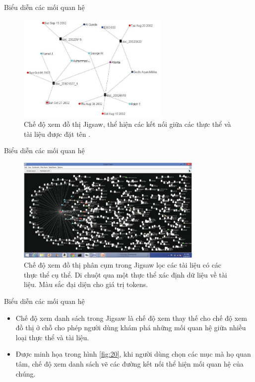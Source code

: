 \documentclass[10pt]{beamer}
\theoremstyle{remark}
\theoremstyle{definition}
\begin{document}
\begin{frame}{Biểu diễn các mối quan hệ}
	\begin{figure}[h!]
        \centering
        \includegraphics[width=0.65\textwidth]{18.png}
        \caption{Chế độ xem đồ thị Jigsaw, thể hiện các kết nối giữa các thực thể và tài liệu được đặt tên \cite{155}.}
        \label{fig:18}
    \end{figure}
\end{frame}

\begin{frame}{Biểu diễn các mối quan hệ}
	\begin{figure}[h!]
        \centering
        \includegraphics[width=0.8\textwidth]{19.png}
        \caption{Chế độ xem đồ thị phân cụm trong Jigsaw lọc các tài liệu có các thực thể cụ thể.
        Di chuột qua một thực thể xác định dữ liệu về tài liệu.
        Màu sắc đại diện cho giá trị tokens.}
        \label{fig:19}
    \end{figure}
\end{frame}

\begin{frame}{Biểu diễn các mối quan hệ}
	\begin{itemize}
		\item Chế độ xem danh sách trong Jigsaw là chế độ xem thay thế cho chế độ xem đồ thị ở chỗ cho phép người dùng khám phá những mối quan hệ giữa nhiều loại thực thể và tài liệu.
		\item Được minh họa trong hình \ref{fig:20}, khi người dùng chọn các mục mà họ quan tâm, chế độ xem danh sách vẽ các đường kết nối thể hiện mối quan hệ của chúng.
	\end{itemize}
\end{frame}
\end{document}
